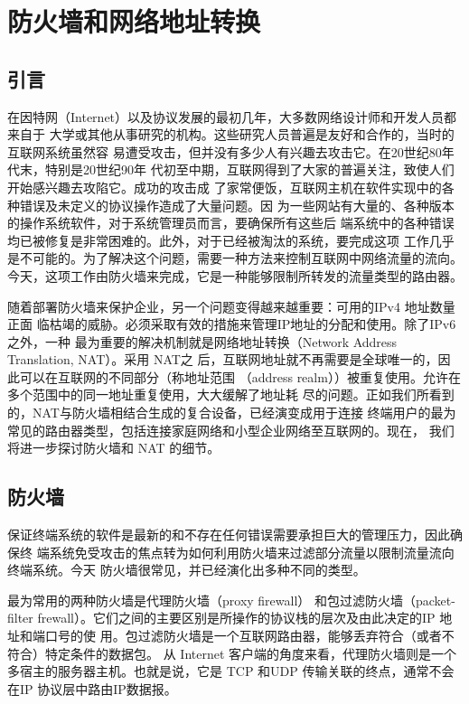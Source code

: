 \chapter{防火墙和网络地址转换}

\section{引言}

在因特网（Internet）以及协议发展的最初几年，大多数网络设计师和开发人员都来自于
大学或其他从事研究的机构。这些研究人员普遍是友好和合作的，当时的互联网系统虽然容
易遭受攻击，但并没有多少人有兴趣去攻击它。在20世纪80年代末，特别是20世纪90年
代初至中期，互联网得到了大家的普遍关注，致使人们开始感兴趣去攻陷它。成功的攻击成
了家常便饭，互联网主机在软件实现中的各种错误及未定义的协议操作造成了大量问题。因
为一些网站有大量的、各种版本的操作系统软件，对于系统管理员而言，要确保所有这些后
端系统中的各种错误均已被修复是非常困难的。此外，对于已经被淘汰的系统，要完成这项
工作几乎是不可能的。为了解决这个问题，需要一种方法来控制互联网中网络流量的流向。
今天，这项工作由防火墙来完成，它是一种能够限制所转发的流量类型的路由器。

随着部署防火墙来保护企业，另一个问题变得越来越重要：可用的IPv4 地址数量正面
临枯竭的威胁。必须采取有效的措施来管理IP地址的分配和使用。除了IPv6之外，一种
最为重要的解决机制就是网络地址转换（Network Address Translation, NAT）。采用 NAT之
后，互联网地址就不再需要是全球唯一的，因此可以在互联网的不同部分（称地址范围
（address realm））被重复使用。允许在多个范围中的同一地址重复使用，大大缓解了地址耗
尽的问题。正如我们所看到的，NAT与防火墙相结合生成的复合设备，已经演变成用于连接
终端用户的最为常见的路由器类型，包括连接家庭网络和小型企业网络至互联网的。现在，
我们将进一步探讨防火墙和 NAT 的细节。

\section{防火墙}

保证终端系统的软件是最新的和不存在任何错误需要承担巨大的管理压力，因此确保终
端系统免受攻击的焦点转为如何利用防火墙来过滤部分流量以限制流量流向终端系统。今天
防火墙很常见，并已经演化出多种不同的类型。

最为常用的两种防火墙是代理防火墙（proxy firewall） 和包过滤防火墙（packet-filter
frewall）。它们之间的主要区别是所操作的协议栈的层次及由此决定的IP 地址和端口号的使
用。包过滤防火墙是一个互联网路由器，能够丢弃符合（或者不符合）特定条件的数据包。
从 Internet 客户端的角度来看，代理防火墙则是一个多宿主的服务器主机。也就是说，它是
TCP 和UDP 传输关联的终点，通常不会在IP 协议层中路由IP数据报。

